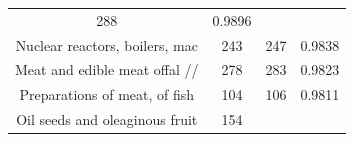 \documentclass[10pt,]{article}
\begin{document}
\begin{longtable}[]{@{}cccc@{}}
\begin{minipage}[t]{0.20\columnwidth}
288\strut
\end{minipage} & \begin{minipage}[t]{0.09\columnwidth}\centering\strut
0.9896\strut
\end{minipage}\tabularnewline
\begin{minipage}[t]{0.38\columnwidth}\centering\strut
Nuclear reactors, boilers, mac\strut
\end{minipage} & \begin{minipage}[t]{0.21\columnwidth}\centering\strut
243\strut
\end{minipage} & \begin{minipage}[t]{0.20\columnwidth}\centering\strut
247\strut
\end{minipage} & \begin{minipage}[t]{0.09\columnwidth}\centering\strut
0.9838\strut
\end{minipage}\tabularnewline
\begin{minipage}[t]{0.38\columnwidth}\centering\strut
Meat and edible meat offal //\strut
\end{minipage} & \begin{minipage}[t]{0.21\columnwidth}\centering\strut
278\strut
\end{minipage} & \begin{minipage}[t]{0.20\columnwidth}\centering\strut
283\strut
\end{minipage} & \begin{minipage}[t]{0.09\columnwidth}\centering\strut
0.9823\strut
\end{minipage}\tabularnewline
\begin{minipage}[t]{0.38\columnwidth}\centering\strut
Preparations of meat, of fish\strut
\end{minipage} & \begin{minipage}[t]{0.21\columnwidth}\centering\strut
104\strut
\end{minipage} & \begin{minipage}[t]{0.20\columnwidth}\centering\strut
106\strut
\end{minipage} & \begin{minipage}[t]{0.09\columnwidth}\centering\strut
0.9811\strut
\end{minipage}\tabularnewline
\begin{minipage}[t]{0.38\columnwidth}\centering\strut
Oil seeds and oleaginous fruit\strut
\end{minipage} & \begin{minipage}[t]{0.21\columnwidth}\centering\strut
154\strut
\end{minipage} & \begin{minipage}[t]{0.20\columnwidth}\centering\strut

\end{minipage}
\end{longtable}
\end{document}
